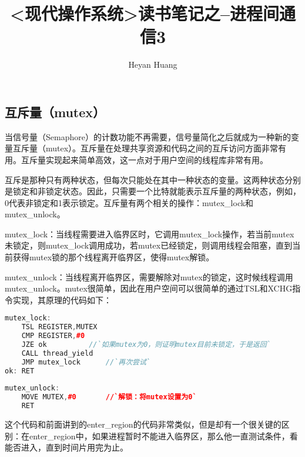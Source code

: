 \documentclass{article}
\title{<现代操作系统>读书笔记之--进程间通信3}
\author{Heyan Huang}
\begin{document}
\begin{CJK}{UTF8}{gbsn}
\maketitle


\lstset{language=c++,
numbers=left, 
numberstyle=\tiny, 
escapeinside=``, 
extendedchars=false %
}

\small{} 

\section{互斥量（mutex）}

    当信号量（Semaphore）的计数功能不再需要，信号量简化之后就成为一种新的变量互斥量（mutex）。互斥量在处理共享资源和代码之间的互斥访问方面非常有用。互斥量实现起来简单高效，这一点对于用户空间的线程库非常有用。

    互斥是那种只有两种状态，但每次只能处在其中一种状态的变量。这两种状态分别是锁定和非锁定状态。因此，只需要一个比特就能表示互斥量的两种状态，例如，0代表非锁定和1表示锁定。互斥量有两个相关的操作：mutex\_lock和mutex\_unlock。

    mutex\_lock：当线程需要进入临界区时，它调用mutex\_lock操作，若当前mutex未锁定，则mutex\_lock调用成功，若mutex已经锁定，则调用线程会阻塞，直到当前获得mutex锁的那个线程离开临界区，使得mutex解锁。

    mutex\_unlock：当线程离开临界区，需要解除对mutex的锁定，这时候线程调用mutex\_unlock。mutex很简单，因此在用户空间可以很简单的通过TSL和XCHG指令实现，其原理的代码如下：

\begin{lstlisting}[language=c++]
mutex_lock:  
    TSL REGISTER,MUTEX  
    CMP REGISTER,#0  
    JZE ok          //`如果mutex为0，则证明mutex目前未锁定，于是返回`
    CALL thread_yield  
    JMP mutex_lock      //`再次尝试`
ok: RET  
  
mutex_unlock:  
    MOVE MUTEX,#0       //`解锁：将mutex设置为0` 
    RET  
\end{lstlisting}

这个代码和前面讲到的enter\_region的代码非常类似，但是却有一个很关键的区别：在enter\_region中，如果进程暂时不能进入临界区，那么他一直测试条件，看能否进入，直到时间片用完为止。
 

\end{CJK}
\end{document}
